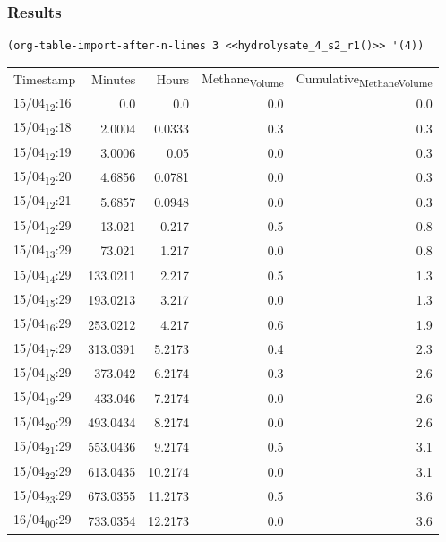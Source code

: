 \documentclass[11pt]{article}
\begin{document}
\subsubsection{Results}
\label{sec:org6f00a2b}

\begin{verbatim}
(org-table-import-after-n-lines 3 <<hydrolysate_4_s2_r1()>> '(4))
\end{verbatim}

\begin{center}
\begin{tabular}{lrrrr}
Timestamp & Minutes & Hours & Methane\textsubscript{Volume} & Cumulative\textsubscript{Methane}\textsubscript{Volume}\\[0pt]
15/04\textsubscript{12}:16 & 0.0 & 0.0 & 0.0 & 0.0\\[0pt]
15/04\textsubscript{12}:18 & 2.0004 & 0.0333 & 0.3 & 0.3\\[0pt]
15/04\textsubscript{12}:19 & 3.0006 & 0.05 & 0.0 & 0.3\\[0pt]
15/04\textsubscript{12}:20 & 4.6856 & 0.0781 & 0.0 & 0.3\\[0pt]
15/04\textsubscript{12}:21 & 5.6857 & 0.0948 & 0.0 & 0.3\\[0pt]
15/04\textsubscript{12}:29 & 13.021 & 0.217 & 0.5 & 0.8\\[0pt]
15/04\textsubscript{13}:29 & 73.021 & 1.217 & 0.0 & 0.8\\[0pt]
15/04\textsubscript{14}:29 & 133.0211 & 2.217 & 0.5 & 1.3\\[0pt]
15/04\textsubscript{15}:29 & 193.0213 & 3.217 & 0.0 & 1.3\\[0pt]
15/04\textsubscript{16}:29 & 253.0212 & 4.217 & 0.6 & 1.9\\[0pt]
15/04\textsubscript{17}:29 & 313.0391 & 5.2173 & 0.4 & 2.3\\[0pt]
15/04\textsubscript{18}:29 & 373.042 & 6.2174 & 0.3 & 2.6\\[0pt]
15/04\textsubscript{19}:29 & 433.046 & 7.2174 & 0.0 & 2.6\\[0pt]
15/04\textsubscript{20}:29 & 493.0434 & 8.2174 & 0.0 & 2.6\\[0pt]
15/04\textsubscript{21}:29 & 553.0436 & 9.2174 & 0.5 & 3.1\\[0pt]
15/04\textsubscript{22}:29 & 613.0435 & 10.2174 & 0.0 & 3.1\\[0pt]
15/04\textsubscript{23}:29 & 673.0355 & 11.2173 & 0.5 & 3.6\\[0pt]
16/04\textsubscript{00}:29 & 733.0354 & 12.2173 & 0.0 & 3.6\\[0pt]

\end{tabular}
\end{center}
\end{document}
